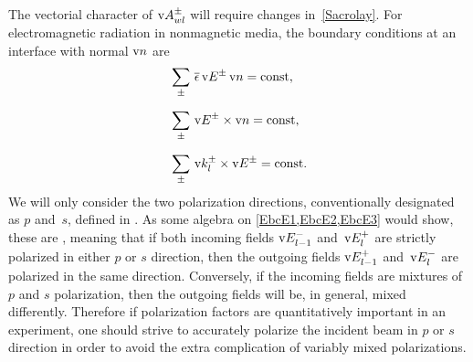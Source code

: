 The vectorial character of $\text{v}{A}^\pm_{wl}$ will require changes in~\cref{Sacrolay}.
For electromagnetic radiation in nonmagnetic media,
the boundary conditions at an interface with normal $\text{v}{n}$ are \cite[eq. 7.37]{Jac75}
\begin{align}
  &\sum_\pm\,\overline{\epsilon}\,\text{v}{E}^\pm\,\text{v}{n} = \text{const}, \label{EbcE1}\\[1.4ex]
  &\sum_\pm\,\text{v}{E}^\pm\times\text{v}{n} = \text{const}, \label{EbcE2}\\[1.4ex]
  &\sum_\pm\,\text{v}{k}^\pm_l\times\text{v}{E}^\pm = \text{const}. \label{EbcE3}
\end{align}
We will only consider the two polarization directions,
%
%
%
%
conventionally designated as $p$ and~$s$, defined in .
As some algebra on \cref{EbcE1,EbcE2,EbcE3} would show,
these are ,
meaning that if both incoming fields $\text{v}{E}^-_{l-1}$ and~$\text{v}{E}^+_l$ are strictly
polarized in either $p$ or $s$ direction,
then the outgoing fields $\text{v}{E}^+_{l-1}$ and~$\text{v}{E}^-_l$
are polarized in the same direction.
Conversely, if the incoming fields are mixtures of $p$ and $s$ polarization,
then the outgoing fields will be, in general, mixed differently.
Therefore if polarization factors are quantitatively important in an experiment,
one should strive to accurately polarize the incident beam in $p$ or $s$ direction
in order to avoid the extra complication of variably mixed polarizations.

